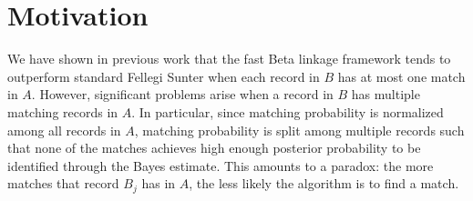 \documentclass[12pt,letterpaper]{article}
\newcommand{\1}[1]{\mathbb{I}\!\left[#1\right]} %
\begin{document}
%
%

\section{Motivation}

We have shown in previous work that the fast Beta linkage framework tends to outperform standard Fellegi Sunter when each record in $B$ has at most one match in $A$. However, significant problems arise when a record in $B$ has multiple matching records in $A$. In particular, since matching probability is normalized among all records in $A$, matching probability is split among multiple records such that none of the matches achieves high enough posterior probability to be identified through the Bayes estimate. This amounts to a paradox: the more matches that record $B_j$ has in $A$, the less likely the algorithm is to find a match. 
\end{document}
